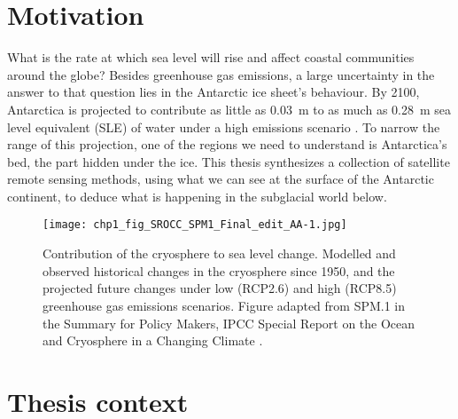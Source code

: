 
\section{Motivation}

What is the rate at which sea level will rise and affect coastal communities around the globe?
Besides greenhouse gas emissions, a large uncertainty in the answer to that question lies in the Antarctic ice sheet's behaviour.
By 2100, Antarctica is projected to contribute as little as \SI{0.03}{\metre} to as much as \SI{0.28}{\metre} sea level equivalent (\gls{SLE}) of water under a high emissions scenario \citep[RCP 8.5, Fig.~\ref{fig:0}f,][]{PortnerSummaryPolicymakers2019}.
To narrow the range of this projection, one of the regions we need to understand is Antarctica's bed, the part hidden under the ice.
This thesis synthesizes a collection of satellite remote sensing methods, using what we can see at the surface of the Antarctic continent, to deduce what is happening in the subglacial world below.

\begin{figure}[htbp]
  \texttt{[image: chp1\_fig\_SROCC\_SPM1\_Final\_edit\_AA-1.jpg]}
  \caption[Cryospheric contribution to sea level change by 2100]{
    Contribution of the cryosphere to sea level change.
    Modelled and observed historical changes in the cryosphere since 1950, and the projected future changes under low (RCP2.6) and high (RCP8.5) greenhouse gas emissions scenarios.
    Figure adapted from SPM.1 in the Summary for Policy Makers, \gls{IPCC} Special Report on the Ocean and Cryosphere in a Changing Climate \citep{PortnerSummaryPolicymakers2019}.
  }
  \label{fig:0}
\end{figure}

\section{Thesis context}

